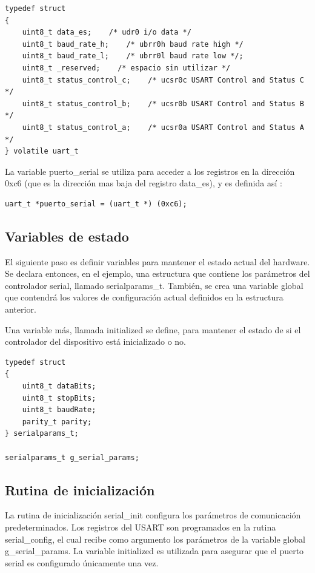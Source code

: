 \documentclass[output=paper, 
colorlinks,
citecolor=brown,
newtxmath
]{langscibook}
\begin{document}
\begin{verbatim}
typedef struct 
{
    uint8_t data_es;	/* udr0 i/o data */
    uint8_t baud_rate_h;    /* ubrr0h baud rate high */
    uint8_t baud_rate_l;    /* ubrr0l baud rate low */;
    uint8_t _reserved;    /* espacio sin utilizar */
    uint8_t status_control_c;    /* ucsr0c USART Control and Status C */
    uint8_t status_control_b;    /* ucsr0b USART Control and Status B */
    uint8_t status_control_a;    /* ucsr0a USART Control and Status A */
} volatile uart_t
\end{verbatim}

La variable puerto\_serial se utiliza para acceder a los registros
en la dirección 0xc6 (que es la dirección mas baja del registro data\_es),
y es definida así :

\begin{verbatim}
uart_t *puerto_serial = (uart_t *) (0xc6);
\end{verbatim}


\subsection {Variables de estado}

El siguiente paso es definir variables para mantener el estado actual
del hardware. Se declara entonces, en el ejemplo, una estructura
que contiene los parámetros del controlador serial, llamado serialparams\_t.
También, se crea una variable global que contendrá los valores 
de configuración actual definidos en la estructura anterior.

Una variable más, llamada initialized se define, para mantener el estado 
de si el 
controlador del dispositivo está inicializado o no.

\begin{verbatim}
typedef struct
{
    uint8_t dataBits;
    uint8_t stopBits;
    uint8_t baudRate;
    parity_t parity;
} serialparams_t;

serialparams_t g_serial_params;
\end{verbatim}


\subsection {Rutina de inicialización}

La rutina de inicialización serial\_init configura los parámetros de comunicación
predeterminados.
Los registros del USART son programados en la rutina serial\_config, el
cual recibe como argumento los parámetros de la variable global g\_serial\_params.
La variable initialized es utilizada para asegurar que el puerto
serial es configurado únicamente una vez.
\end{document}
